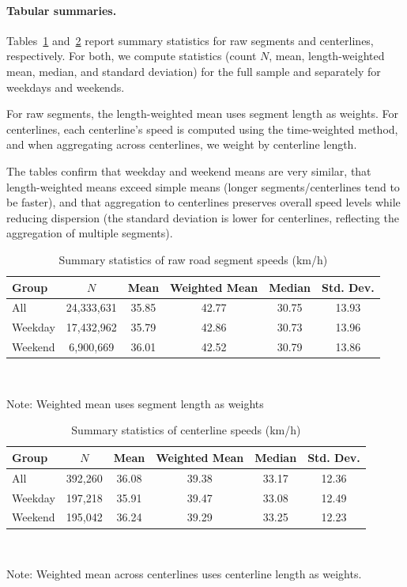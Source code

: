 \documentclass[12pt]{article}
\begin{document}
	\paragraph{Tabular summaries.}
	
	Tables~\ref{tab:raw-speed-stats} and~\ref{tab:centerline-speed-stats} report summary statistics for raw segments and centerlines, respectively. For both, we compute statistics (count $N$, mean, length-weighted mean, median, and standard deviation) for the full sample and separately for weekdays and weekends. 
	
	For raw segments, the length-weighted mean uses segment length as weights. For centerlines, each centerline's speed is computed using the time-weighted method, and when aggregating across centerlines, we weight by centerline length.
	
	The tables confirm that weekday and weekend means are very similar, that length-weighted means exceed simple means (longer segments/centerlines tend to be faster), and that aggregation to centerlines preserves overall speed levels while reducing dispersion (the standard deviation is lower for centerlines, reflecting the aggregation of multiple segments).
	
	\begin{table}[h!]
		\centering
		\caption{Summary statistics of raw road segment speeds (km/h)}
		\label{tab:raw-speed-stats}
		\begin{tabular}{lccccc}
			\toprule
			Group & $N$ & Mean & Weighted Mean & Median & Std. Dev. \\
			\midrule
			All & 24,333,631 & 35.85 & 42.77 & 30.75 & 13.93 \\
			Weekday & 17,432,962 & 35.79 & 42.86 & 30.73 & 13.96 \\
			Weekend & 6,900,669 & 36.01 & 42.52 & 30.79 & 13.86 \\
			\bottomrule
		\end{tabular} \\
	\vspace{0.3em}
	{\footnotesize\raggedright Note: Weighted mean uses segment length as weights
	}
	\end{table}
	
	\begin{table}[h!]
		\centering
		\caption{Summary statistics of centerline speeds (km/h)}
		\label{tab:centerline-speed-stats}
		\begin{tabular}{lccccc}
			\toprule
			Group & $N$ & Mean & Weighted Mean & Median & Std. Dev. \\
			\midrule
			All      & 392{,}260 & 36.08 & 39.38 & 33.17 & 12.36 \\
			Weekday & 197{,}218 & 35.91 & 39.47 & 33.08 & 12.49 \\
			Weekend & 195{,}042 & 36.24 & 39.29 & 33.25 & 12.23 \\
			\bottomrule
		\end{tabular} \\
		\vspace{0.3em}
		{\footnotesize\raggedright
			Note: Weighted mean across centerlines uses centerline length as weights.
		}
	\end{table}
	
\end{document}
